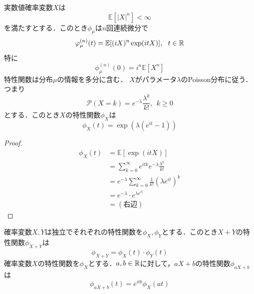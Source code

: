 \documentclass[dvipdfmx, leqno]{jsbook}
\begin{document}
    実数値確率変数$X$は
\begin{equation}
    \mathbb{E}[|X|^n]< \infty
\end{equation}
    を満たすとする．このとき$\phi_\mu$は$n$回連続微分で 
\begin{equation}
    \varphi^{(n)}_\mu(t)= \mathbb{E}[(iX)^n\exp(itX)],\ \ t\in \mathbb{R}
\end{equation}
    特に
\begin{equation}
    \phi^{(n)}_\mu(0)= i^n\mathbb{E}[X^n]
\end{equation}
    特性関数は分布$\mu$の情報を多分に含む．
    $X$がパラメータ$\lambda$のPoisson分布に従う．つまり
\begin{equation}
    \mathcal{P}(X= k)= e^{-\lambda}\frac{\lambda^k}{k!},\ \ k\ge 0
\end{equation}
    とする．このとき$X$の特性関数$\phi_X$は
\begin{equation}
    \phi_X(t)= \exp(\lambda(e^{it}- 1))
\end{equation}
\begin{proof}
\begin{align}
    \phi_X(t)
    &= \mathbb{E}[\exp(itX)]\\
    &= \sum_{k= 0}^\infty e^{itk}e^{-\lambda}\frac{\lambda^k}{k!}\\
    &= e^{-\lambda}\sum_{k= 0}^\infty \frac{1}{k!}(\lambda e^{it})^k\\
    &= e^{-\lambda}\cdot e^{\lambda e^{it}}\\
    &= (右辺)
\end{align}
\end{proof}

    確率変数$X, Y$は独立でそれぞれの特性関数を$\phi_X, \phi_Y$とする．このとき$X+ Y$の特性関数$\phi_{X+ Y}$は
\begin{equation}
    \phi_{X+ Y}= \phi_X(t)\cdot \phi_Y(t)
\end{equation}
    確率変数$X$の特性関数を$\phi_X$とする．$a, b\in \mathbb{R}$に対して，$aX+ b$の特性関数$\phi_{aX+ b}$は
\begin{equation}
    \phi_{aX+ b}(t)= e^{itb} \phi_X(at)
\end{equation}
\end{document}
